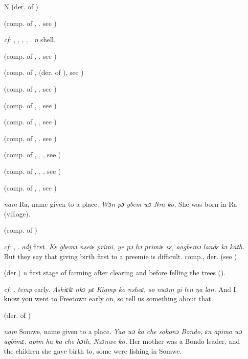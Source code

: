 \begin{letter}{N}
 (der. of ) 

 (comp. of , , see ) 

 \textit{cf}: , , , , . \textit{n} shell.

 (comp. of , , see ) 

 (comp. of ,  (der. of ), see ) 

 (comp. of , , see ) 

 (comp. of , , see ) 

 (comp. of , , see ) 

 (comp. of , , see ) 

 (comp. of , , , see ) 

 (comp. of , , , see ) 

 (comp. of , , see ) 

 \textit{nam} Ra, name given to a place. \textit{Wɔn pɔ gbem wɔ Nra ko.} She was born in Ra (village).

 (comp. of ) 

 \textit{cf}: , . \textit{adj} first. \textit{Kɛ gbemɔ nseiɛ primi, ye pɔ hɔ primiɛ vɛ, aagbemɔ landɛ kɔ kath.} But they say that giving birth first to a preemie is difficult. comp., der.  (see )

 (der.) \textit{n} first stage of farming after clearing and before felling the trees (\citealt{Pichl1967}). 

 \textit{cf}: . \textit{temp} early. \textit{Ashiɛlɛ nkɔ pɛ Kiamp ko nsheɛ, so nwɔm yi len ŋa lan.} And I know you went to Freetown early on, so tell us something about that.

 (der. of ) 

 \textit{nam} Somwe, name given to a place. \textit{Yaa wɔ ka che sokonɔ Bondo, ɛn apima wɔ agbimɛ, apim ha ka che hɔth, Nsɔnwe ko.} Her mother was a Bondo leader, and the children she gave birth to, some were fishing in Somwe.


\end{letter}
